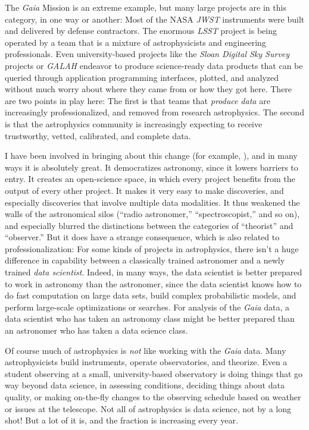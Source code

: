 \documentclass{article}
\begin{document}
The \textsl{Gaia} Mission is an extreme example, but many large projects are in this category, in one way or another:
Most of the NASA \textsl{JWST} \cite{jwst} instruments were built and delivered by defense contractors.
The enormous \textsl{LSST} project \cite{lsst} is being operated by a team that is a mixture of astrophysicists and engineering professionals.
Even university-based projects like the \textsl{Sloan Digital Sky Survey} projects \cite{sdssiv, sdssv} or \textsl{GALAH} \cite{galah} endeavor to produce science-ready data products that can be queried through application programming interfaces, plotted, and analyzed without much worry about where they came from or how they got here.
There are two points in play here:
The first is that teams that \emph{produce data} are increasingly professionalized, and removed from research astrophysics.
The second is that the astrophysics community is increasingly expecting to receive trustworthy, vetted, calibrated, and complete data.

I have been involved in bringing about this change (for example, \cite{monitor, ubercal, astrometrynet, opendata}), and in many ways it is absolutely great.
It democratizes astronomy, since it lowers barriers to entry.
It creates an open-science space, in which every project benefits from the output of every other project.
It makes it very easy to make discoveries, and especially discoveries that involve multiple data modalities.
It thus weakened the walls of the astronomical silos (``radio astronomer,'' ``spectroscopist,'' and so on), and especially blurred the distinctions between the categories of ``theorist'' and ``observer.''
But it does have a strange consequence, which is also related to professionalization:
For some kinds of projects in astrophysics, there isn't a huge difference in capability between a classically trained astronomer and a newly trained \emph{data scientist}.
Indeed, in many ways, the data scientist is better prepared to work in astronomy than the astronomer, since the data scientist knows how to do fast computation on large data sets, build complex probabilistic models, and perform large-scale optimizations or searches.
For analysis of the \textsl{Gaia} data, a data scientist who has taken an astronomy class might be better prepared than an astronomer who has taken a data science class.

Of course much of astrophysics is \emph{not} like working with the \textsl{Gaia} data.
Many astrophysicists build instruments, operate observatories, and theorize.
Even a student observing at a small, university-based observatory is doing things that go way beyond data science, in assessing conditions, deciding things about data quality, or making on-the-fly changes to the observing schedule based on weather or issues at the telescope.
Not all of astrophysics is data science, not by a long shot!
But a lot of it is, and the fraction is increasing every year.
\end{document}
